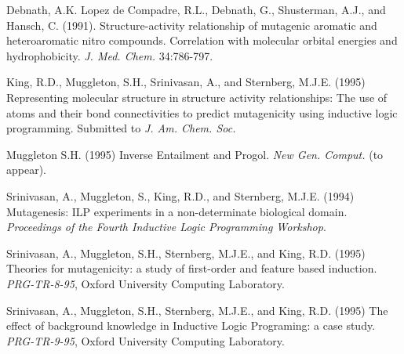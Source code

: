 \begin{thebibliography}{}

Debnath, A.K. Lopez de Compadre, R.L., Debnath, G., Shusterman, A.J.,
and Hansch, C. (1991).
Structure-activity relationship of mutagenic
aromatic and heteroaromatic nitro compounds.  Correlation with
molecular orbital energies and hydrophobicity.
{\sl J. Med. Chem.} 34:786-797.

King, R.D., Muggleton, S.H., Srinivasan, A., and Sternberg, M.J.E. (1995)
Representing molecular structure in structure activity relationships: The use
of atoms and their bond connectivities to predict mutagenicity using
inductive logic programming.
Submitted to {\sl J. Am. Chem. Soc.}

Muggleton S.H. (1995)
Inverse Entailment and Progol.
{\sl New Gen. Comput.} (to appear).

Srinivasan, A., Muggleton, S., King, R.D., and Sternberg, M.J.E. (1994)
Mutagenesis: ILP experiments in a non-determinate biological domain. 
{\sl Proceedings of the Fourth Inductive Logic Programming Workshop}.

Srinivasan, A., Muggleton, S.H., Sternberg, M.J.E., and King, R.D. (1995)
Theories for mutagenicity: a study of first-order and feature based induction.
{\sl PRG-TR-8-95}, Oxford University Computing Laboratory.

Srinivasan, A., Muggleton, S.H., Sternberg, M.J.E., and King, R.D. (1995)
The effect of background knowledge in Inductive Logic Programing:
a case study.
{\sl PRG-TR-9-95}, Oxford University Computing Laboratory.


\end{thebibliography}



